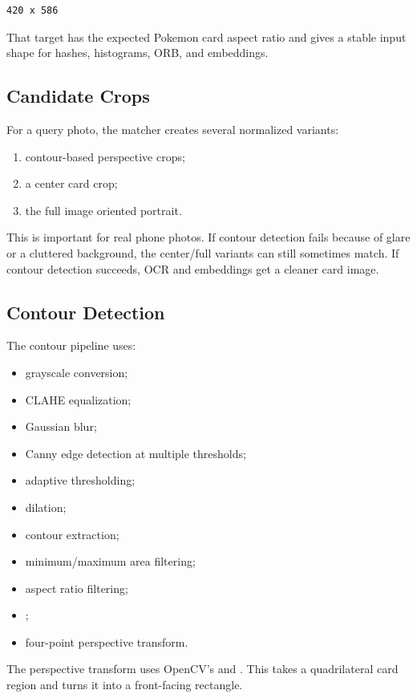 \documentclass[11pt,a4paper]{article}
\begin{document}
\begin{lstlisting}
420 x 586
\end{lstlisting}

That target has the expected Pokemon card aspect ratio and gives a stable input shape for hashes, histograms, ORB, and embeddings.

\subsection{Candidate Crops}

For a query photo, the matcher creates several normalized variants:

\begin{enumerate}
  \item contour-based perspective crops;
  \item a center card crop;
  \item the full image oriented portrait.
\end{enumerate}

This is important for real phone photos. If contour detection fails because of glare or a cluttered background, the center/full variants can still sometimes match. If contour detection succeeds, OCR and embeddings get a cleaner card image.

\subsection{Contour Detection}

The contour pipeline uses:

\begin{itemize}
  \item grayscale conversion;
  \item CLAHE equalization;
  \item Gaussian blur;
  \item Canny edge detection at multiple thresholds;
  \item adaptive thresholding;
  \item dilation;
  \item contour extraction;
  \item minimum/maximum area filtering;
  \item aspect ratio filtering;
  \item {};
  \item four-point perspective transform.
\end{itemize}

The perspective transform uses OpenCV's  and . This takes a quadrilateral card region and turns it into a front-facing rectangle.
\end{document}
